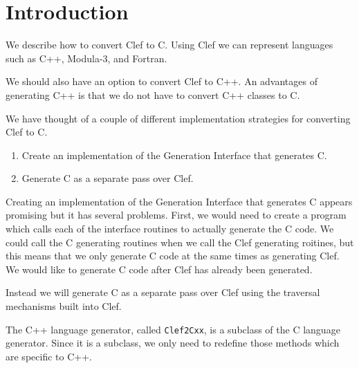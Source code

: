 
\chapter{Introduction}\label{chap:intro}

We describe how to convert Clef to C.  Using Clef we can
represent languages such as C++\cite{ellis:90}, Modula-3, and Fortran.

We should also have an option to convert Clef to C++. An advantages of
generating C++ is that we do not have to convert C++ classes to C.

We have thought of a couple of different implementation strategies
for converting Clef to C.
\begin{enumerate}
\item Create an implementation of the Generation Interface that
generates C.
\item Generate C as a separate pass over Clef.
\end{enumerate}

Creating an implementation of the Generation Interface that generates
C appears promising but it has several problems.  First, we would need
to create a program which calls each of the interface routines to
actually generate the C code.  We could call the C generating routines
when we call the Clef generating roitines, but this means that we only
generate C code at the same times as generating Clef.  We would like
to generate C code after Clef has already been generated.

Instead we will generate C as a separate pass over Clef using the
traversal mechanisms built into Clef.

The C++ language generator, called {\tt Clef2Cxx}, is a subclass of
the C language generator.  Since it is a subclass, we only need
to redefine those methods which are specific to C++.



